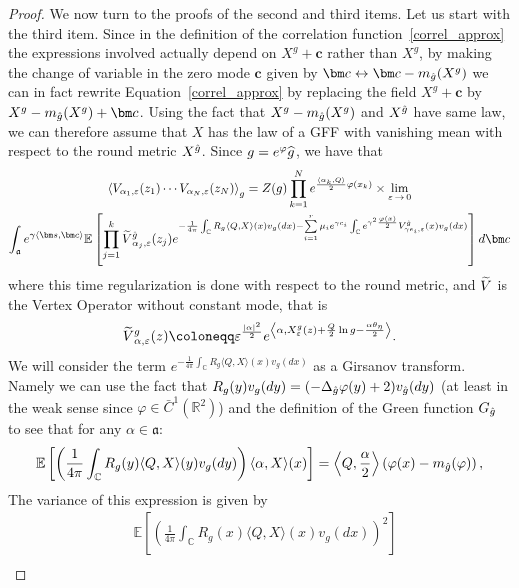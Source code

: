 \documentclass[AHL,Unicode,longabstracts,published]{cedram}
\renewcommand{\tilde}{\widetilde}
\newcommand{\frka}{\mathfrak{a}}
\newcommand{\C}{\mathbb{C}}
\newcommand{\R}{\mathbb{R}}
\newcommand{\E}{\mathbb{E}}
\newcommand{\ps}[1]{\langle #1 \rangle}
\newcommand*\eps{\varepsilon}
\let\oldtilde\tilde
\renewcommand*{\tilde}[1]{\mathchoice{\widetilde{#1}}{\widetilde{#1}}{\oldtilde{#1}}{\oldtilde{#1}}}
\let\oldhat\hat
\renewcommand*{\hat}[1]{\mathchoice{\widehat{#1}}{\widehat{#1}}{\oldhat{#1}}{\oldhat{#1}}}
\begin{document}
\begin{proof}
We now turn to the proofs of the second and third items. Let us start with the third item. Since in the definition of the correlation function~\eqref{correl_approx} the expressions involved actually depend on $X^g +\bm c$ rather than $X^g$, by making the change of variable in the zero mode $\bm c$ given by $\bm c\leftrightarrow \bm c-m_{\hat g}(X^g)$ we can in fact rewrite Equation~\eqref{correl_approx} by replacing the field $X^g+\bm c$ by $X^{g}-m_{\hat g}(X^g) +\bm c$. Using the fact that $X^g-m_{\hat g}(X^g)$ and $X^{\hat g}$ have same law, we can therefore assume that $X$ has the law of a GFF with vanishing mean with respect to the round metric $X^{\hat g}$. Since $g=e^{\varphi} \hat{g}$, we have that
\begin{multline*}
\left\langle V_{\alpha_1,\eps}(z_1) \cdots V_{\alpha_N,\eps}(z_N) \right\rangle_g = Z(g)\prod_{k=1}^N e^{\frac{\ps{\alpha_k,Q}}{2}\varphi(x_k)} \times \underset{\eps\,\to\,0}{\lim} \\
\int_{\frka} e^{\gamma\ps{\bm s,\bm c}} \E \left [\prod_{j=1}^k \tilde V^{\hat g}_{\alpha_j,\eps}(z_j) e^{-\frac{1}{4 \pi} \int_{\C} R_g \left\langle Q, X \right\rangle (x) v_g(dx) - \sum\limits_{i=1}^{r} \mu_i e^{\gamma c_i} \int_{\C} e^{ \gamma^2 \frac{\varphi(x)}{2} } V^{\hat g}_{\gamma e_i,\eps}(x) v_g(dx) } \right] d\bm c
\end{multline*}
where this time regularization is done with respect to the round metric, and $\tilde V$ is the Vertex Operator without constant mode, that is
\[
\tilde V^g_{\alpha,\eps}(z)\coloneqq \eps^{ \frac{|\alpha|^2}{2}} e^{ \left\langle\alpha, X^g_\eps(z) + \frac Q2\ln g-\frac{\alpha\theta_{\eta}}2\right\rangle}.
\]
We will consider the term $e^{-\frac{1}{4 \pi} \int_{\C} R_g \langle Q, X \rangle (x) v_g(dx)}$ as a Girsanov transform. Namely we can use the fact that $R_g(y)v_g(dy)=(-\Delta_{\hat{g}} \varphi(y) +2)v_{\hat g}(dy)$ (at least in the weak sense since $\varphi\in \bar{C}^1(\R^2)$) and the definition of the Green function $G_{\hat g}$ to see that for any $\alpha\in\frka$:
\begin{equation*}
\E \left [\left(\frac{1}{4\pi}\int_{\C} R_g(y) \langle Q, X \rangle (y) v_g(dy) \right) \langle \alpha, X\rangle (x) \right]= \left\langle Q,\frac\alpha2 \right\rangle \left(\varphi(x) -m_{\hat g}(\varphi)\right),
\end{equation*}
The variance of this expression is given by
\begin{align*}
& \E \left [\left (\frac{1}{4\pi} \int_{\C} R_g(x) \langle Q, X \rangle (x) v_g(dx) \right)^2 \right] \\

\end{align*}
\end{proof}
\end{document}
